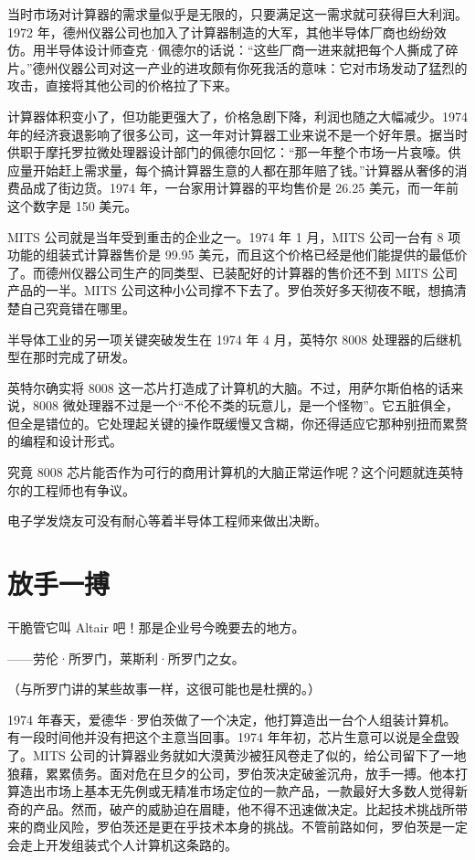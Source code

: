 \documentclass[12pt,UTF8]{ctexbook}
\begin{document}
当时市场对计算器的需求量似乎是无限的，只要满足这一需求就可获得巨大利润。1972 年，德州仪器公司也加入了计算器制造的大军，其他半导体厂商也纷纷效仿。用半导体设计师查克·佩德尔的话说：“这些厂商一进来就把每个人撕成了碎片。”德州仪器公司对这一产业的进攻颇有你死我活的意味：它对市场发动了猛烈的攻击，直接将其他公司的价格拉了下来。

计算器体积变小了，但功能更强大了，价格急剧下降，利润也随之大幅减少。1974 年的经济衰退影响了很多公司，这一年对计算器工业来说不是一个好年景。据当时供职于摩托罗拉微处理器设计部门的佩德尔回忆：“那一年整个市场一片哀嚎。供应量开始赶上需求量，每个搞计算器生意的人都在那年赔了钱。”计算器从奢侈的消费品成了街边货。1974 年，一台家用计算器的平均售价是 26.25 美元，而一年前这个数字是 150 美元。

MITS 公司就是当年受到重击的企业之一。1974 年 1 月，MITS 公司一台有 8 项功能的组装式计算器售价是 99.95 美元，而且这个价格已经是他们能提供的最低价了。而德州仪器公司生产的同类型、已装配好的计算器的售价还不到 MITS 公司产品的一半。MITS 公司这种小公司撑不下去了。罗伯茨好多天彻夜不眠，想搞清楚自己究竟错在哪里。

半导体工业的另一项关键突破发生在 1974 年 4 月，英特尔 8008 处理器的后继机型在那时完成了研发。

英特尔确实将 8008 这一芯片打造成了计算机的大脑。不过，用萨尔斯伯格的话来说，8008 微处理器不过是一个“不伦不类的玩意儿，是一个怪物”。它五脏俱全，但全是错位的。它处理起关键的操作既缓慢又含糊，你还得适应它那种别扭而累赘的编程和设计形式。

究竟 8008 芯片能否作为可行的商用计算机的大脑正常运作呢？这个问题就连英特尔的工程师也有争议。

电子学发烧友可没有耐心等着半导体工程师来做出决断。





\section{放手一搏}


干脆管它叫 Altair 吧！那是企业号今晚要去的地方。

——劳伦·所罗门，莱斯利·所罗门之女。

（与所罗门讲的某些故事一样，这很可能也是杜撰的。）



1974 年春天，爱德华·罗伯茨做了一个决定，他打算造出一台个人组装计算机。有一段时间他并没有把这个主意当回事。1974 年年初，芯片生意可以说是全盘毁了。MITS 公司的计算器业务就如大漠黄沙被狂风卷走了似的，给公司留下了一地狼藉，累累债务。面对危在旦夕的公司，罗伯茨决定破釜沉舟，放手一搏。他本打算造出市场上基本无先例或无精准市场定位的一款产品，一款最好大多数人觉得新奇的产品。然而，破产的威胁迫在眉睫，他不得不迅速做决定。比起技术挑战所带来的商业风险，罗伯茨还是更在乎技术本身的挑战。不管前路如何，罗伯茨是一定会走上开发组装式个人计算机这条路的。
\end{document}
